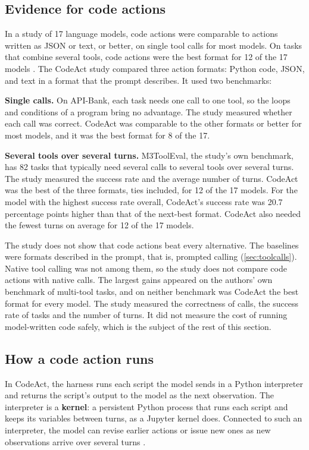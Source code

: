 \subsection{Evidence for code actions}
\label{sec:codeact-evidence}

In a study of 17 language models, code actions were comparable to actions written as JSON or text,
or better, on single tool calls for most models. On tasks that combine several tools, code actions
were the best format for 12 of the 17 models \citep{wang2024codeact}. The CodeAct study compared
three action formats: Python code, JSON, and text in a format that the prompt describes. It used
two benchmarks:
\bi
\item \textbf{Single calls.} On API-Bank, each task needs one call to one tool, so the loops and
conditions of a program bring no advantage. The study measured whether each call was correct.
CodeAct was comparable to the other formats or better for most models, and it was the best format
for 8 of the 17.
\item \textbf{Several tools over several turns.} M3ToolEval, the study's own benchmark, has 82
tasks that typically need several calls to several tools over several turns. The study measured
the success rate and the average number of turns. CodeAct was the best of the three formats, ties
included, for 12 of the 17 models. For the model with the highest success rate overall, CodeAct's
success rate was 20.7 percentage points higher than that of the next-best format. CodeAct also
needed the fewest turns on average for 12 of the 17 models.
\ei

The study does not show that code actions beat every alternative. The baselines were formats
described in the prompt, that is, prompted calling (\cref{sec:toolcalls}). Native tool calling was
not among them, so the study does not compare code actions with native calls. The largest gains
appeared on the authors' own benchmark of multi-tool tasks, and on neither benchmark was CodeAct
the best format for every model. The study measured the correctness of calls, the success rate of
tasks and the number of turns. It did not measure the cost of running model-written code safely,
which is the subject of the rest of this section.

\subsection{How a code action runs}
\label{sec:codeact-loop}

In CodeAct, the harness runs each script the model sends in a Python interpreter and returns the
script's output to the model as the next observation. The interpreter is a \textbf{kernel}: a
persistent Python process that runs each script and keeps its variables between turns, as a
Jupyter kernel does. Connected to such an interpreter, the model can revise earlier actions or
issue new ones as new observations arrive over several turns \citep{wang2024codeact}.

